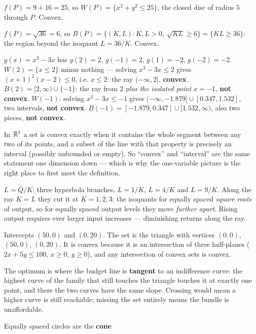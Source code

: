 \begin{solutions}
  \item $f(P)=9+16=25$, so $W(P)=\{x^{2}+y^{2}\le25\}$, the closed disc of
        radius $5$ through $P$. Convex.
  \item $f(P)=\sqrt{36}=6$, so
        $B(P)=\{(K,L):K,L>0,\ \sqrt{KL}\ge6\}=\{KL\ge36\}$: the region
        beyond the isoquant $L=36/K$. Convex.
  \item $g(x)=x^{3}-3x$ has $g(2)=2$, $g(-1)=2$, $g(1)=-2$, $g(-2)=-2$.
        $W(2)=\{x\le2\}$ minus nothing --- solving $x^{3}-3x\le2$ gives
        $(x+1)^{2}(x-2)\le0$, i.e. $x\le2$: the ray $(-\infty,2]$,
        \textbf{convex}. $B(2)=[2,\infty)\cup\{-1\}$: the ray from $2$
        \emph{plus the isolated point} $x=-1$, \textbf{not convex}.
        $W(-1)$: solving $x^{3}-3x\le-1$ gives
        $(-\infty,-1.879]\cup[0.347,1.532]$, two intervals, \textbf{not
        convex}. $B(-1)=[-1.879,0.347]\cup[1.532,\infty)$, also two
        pieces, \textbf{not convex}.
  \item In $\mathbb{R}^{1}$ a set is convex exactly when it contains the whole
        segment between any two of its points, and a subset of the line
        with that property is precisely an interval (possibly unbounded or
        empty). So ``convex'' and ``interval'' are the same statement one
        dimension down --- which is why the one-variable picture is the
        right place to first meet the definition.
  \item $L=\bar Q/K$: three hyperbola branches, $L=1/K$, $L=4/K$ and
        $L=9/K$. Along the ray $K=L$ they cut it at
        $K=1,2,3$: the isoquants for equally spaced \emph{square roots} of
        output, so for equally spaced output levels they move
        \emph{further apart}. Rising output requires ever larger input
        increases --- diminishing returns along the ray.
  \item Intercepts $(50,0)$ and $(0,20)$. The set is the triangle with
        vertices $(0,0)$, $(50,0)$, $(0,20)$. It is convex because it is an
        intersection of three half-planes ($2x+5y\le100$, $x\ge0$,
        $y\ge0$), and any intersection of convex sets is convex.
  \item The optimum is where the budget line is \textbf{tangent} to an
        indifference curve: the highest curve of the family that still
        touches the triangle touches it at exactly one point, and there the
        two curves have the same slope. Crossing would mean a higher curve
        is still reachable; missing the set entirely means the bundle is
        unaffordable.
  \item Equally spaced circles are the \textbf{cone}

\end{solutions}
